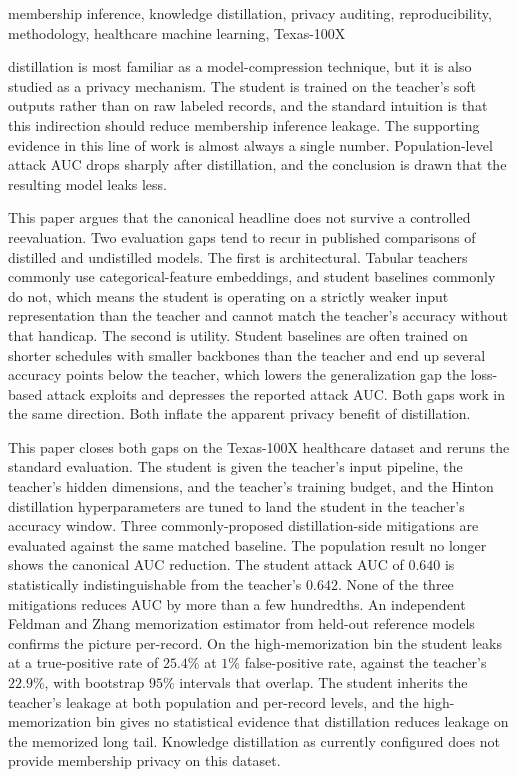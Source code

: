 \documentclass[conference]{IEEEtran}
\begin{document}
\begin{IEEEkeywords}
membership inference, knowledge distillation, privacy auditing, reproducibility, methodology, healthcare machine learning, Texas-100X
\end{IEEEkeywords}

 distillation is most familiar as a model-compression technique, but it is also studied as a privacy mechanism. The student is trained on the teacher's soft outputs rather than on raw labeled records, and the standard intuition is that this indirection should reduce membership inference leakage. The supporting evidence in this line of work is almost always a single number. Population-level attack AUC drops sharply after distillation, and the conclusion is drawn that the resulting model leaks less.

This paper argues that the canonical headline does not survive a controlled reevaluation. Two evaluation gaps tend to recur in published comparisons of distilled and undistilled models. The first is architectural. Tabular teachers commonly use categorical-feature embeddings, and student baselines commonly do not, which means the student is operating on a strictly weaker input representation than the teacher and cannot match the teacher's accuracy without that handicap. The second is utility. Student baselines are often trained on shorter schedules with smaller backbones than the teacher and end up several accuracy points below the teacher, which lowers the generalization gap the loss-based attack exploits and depresses the reported attack AUC. Both gaps work in the same direction. Both inflate the apparent privacy benefit of distillation.

This paper closes both gaps on the Texas-100X healthcare dataset and reruns the standard evaluation. The student is given the teacher's input pipeline, the teacher's hidden dimensions, and the teacher's training budget, and the Hinton distillation hyperparameters are tuned to land the student in the teacher's accuracy window. Three commonly-proposed distillation-side mitigations are evaluated against the same matched baseline. The population result no longer shows the canonical AUC reduction. The student attack AUC of $0.640$ is statistically indistinguishable from the teacher's $0.642$. None of the three mitigations reduces AUC by more than a few hundredths. An independent Feldman and Zhang memorization estimator from held-out reference models confirms the picture per-record. On the high-memorization bin the student leaks at a true-positive rate of $25.4\%$ at $1\%$ false-positive rate, against the teacher's $22.9\%$, with bootstrap $95\%$ intervals that overlap. The student inherits the teacher's leakage at both population and per-record levels, and the high-memorization bin gives no statistical evidence that distillation reduces leakage on the memorized long tail. Knowledge distillation as currently configured does not provide membership privacy on this dataset.
\end{document}
